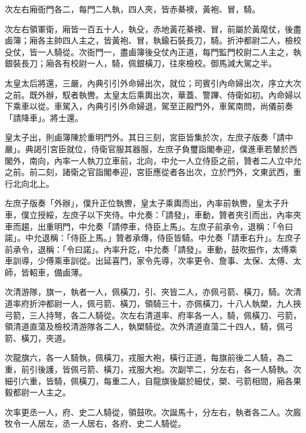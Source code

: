 \begin{pinyinscope}
 次左右廂衙門各二，每門二人執，四人夾，皆赤綦襖，黃袍、冒，騎。



 次左右領軍衛，廂皆一百五十人，執殳，赤地黃花綦襖、冒，前屬於黃麾仗，後盡鹵簿；廂各主帥四人主之，皆黃袍、冒，執鍮石裝長刀，騎。折沖都尉二人，檢校殳仗，皆一人騎從。次衙門一，盡鹵簿後殳仗內正道，每門監門校尉二人主之，執銀裝長刀；廂各有校尉一人，騎，佩銀橫刀，往來檢校。御馬減大駕之半。



 太皇太后將還，三嚴，內典引引外命婦出次，就位；司賓引內命婦出次，序立大次之前。既外辦，馭者執轡。太皇太后乘輿出次，華蓋、警蹕、侍衛如初。內命婦以下乘車以從。車駕入，內典引引外命婦退，駕至正殿門外，車駕南問，尚儀前奏「請降車」。將士還。



 皇太子出，則鹵簿陳於重明門外。其日三刻，宮臣皆集於次，左庶子版奏「請中嚴」。典謁引宮臣就位，侍衛官服其器服，左庶子負璽詣閣奉迎，僕進車若輦於西閣外，南向，內率一人執刀立車前，北向，中允一人立侍臣之前，贊者二人立中允之前。前二刻，諸衛之官詣閣奉迎，宮臣應從者各出次，立於門外，文東武西，重行北向北上。



 左庶子版奏「外辦」，僕升正位執轡，皇太子乘輿而出，內率前執轡，皇太子升車，僕立授綏，左庶子以下夾侍。中允奏：「請發」，車動，贊者夾引而出，內率夾車而趨，出重明門，中允奏「請停車，侍臣上馬」。左庶子前承令，退稱：「令曰諾」。中允退稱：「侍臣上馬。」贊者承傳，侍臣皆騎。中允奏「請車右升」。左庶子前承令，退稱：「令曰諾」。內率升訖，中允奏「請發」。車動，鼓吹振作，太傅乘車訓導，少傅乘車訓從。出延喜門，家令先導，次率更令、詹事、太保、太傅、太師，皆軺車，備鹵薄。



 次清游隊，旗一，執者一人，佩橫刀，引、夾皆二人，亦佩弓箭、橫刀，騎。次清道率府折沖都尉一人，佩弓箭、橫刀，領騎三十，亦佩橫刀，十八人執槊，九人挾弓箭，三人持弩，各二人騎從。次左右清道率、府率各一人，騎，佩橫刀、弓箭，領清道直蕩及檢校清游隊各二人，執槊騎從。次外清道直蕩二十四人，騎，佩弓箭、橫刀，夾道。



 次龍旗六，各一人騎執，佩橫刀，戎服大袍，橫行正道，每旗前後二人騎，為二重，前引後護，皆佩弓箭、橫刀，戎服大袍。次副竿二，分左右，各一人騎執。次細引六重，皆騎，佩橫刀，每重二人，自龍旗後屬於細仗，槊、弓箭相間，廂各果毅都尉一人主之。



 次率更丞一人，府、史二人騎從，領鼓吹。次誕馬十，分左右，執者各二人。次廄牧令一人居左，丞一人居右，各府、史二人騎從。




\end{pinyinscope}
